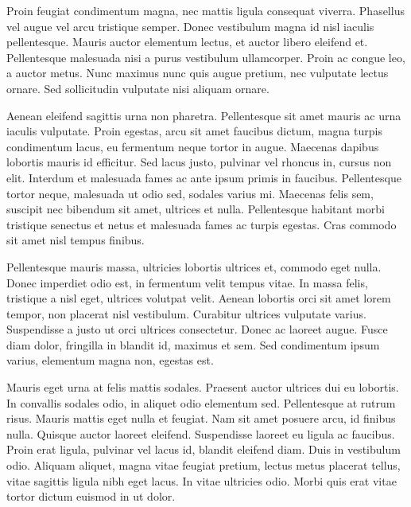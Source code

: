 \documentclass[11pt]{article}
\begin{document}
    Proin feugiat condimentum magna, nec mattis ligula consequat viverra. Phasellus vel augue vel arcu tristique semper. Donec vestibulum magna id nisl iaculis pellentesque. Mauris auctor elementum lectus, et auctor libero eleifend et. Pellentesque malesuada nisi a purus vestibulum ullamcorper. Proin ac congue leo, a auctor metus. Nunc maximus nunc quis augue pretium, nec vulputate lectus ornare. Sed sollicitudin vulputate nisi aliquam ornare.

    Aenean eleifend sagittis urna non pharetra. Pellentesque sit amet mauris ac urna iaculis vulputate. Proin egestas, arcu sit amet faucibus dictum, magna turpis condimentum lacus, eu fermentum neque tortor in augue. Maecenas dapibus lobortis mauris id efficitur. Sed lacus justo, pulvinar vel rhoncus in, cursus non elit. Interdum et malesuada fames ac ante ipsum primis in faucibus. Pellentesque tortor neque, malesuada ut odio sed, sodales varius mi. Maecenas felis sem, suscipit nec bibendum sit amet, ultrices et nulla. Pellentesque habitant morbi tristique senectus et netus et malesuada fames ac turpis egestas. Cras commodo sit amet nisl tempus finibus.

    Pellentesque mauris massa, ultricies lobortis ultrices et, commodo eget nulla. Donec imperdiet odio est, in fermentum velit tempus vitae. In massa felis, tristique a nisl eget, ultrices volutpat velit. Aenean lobortis orci sit amet lorem tempor, non placerat nisl vestibulum. Curabitur ultrices vulputate varius. Suspendisse a justo ut orci ultrices consectetur. Donec ac laoreet augue. Fusce diam dolor, fringilla in blandit id, maximus et sem. Sed condimentum ipsum varius, elementum magna non, egestas est.

    Mauris eget urna at felis mattis sodales. Praesent auctor ultrices dui eu lobortis. In convallis sodales odio, in aliquet odio elementum sed. Pellentesque at rutrum risus. Mauris mattis eget nulla et feugiat. Nam sit amet posuere arcu, id finibus nulla. Quisque auctor laoreet eleifend. Suspendisse laoreet eu ligula ac faucibus. Proin erat ligula, pulvinar vel lacus id, blandit eleifend diam. Duis in vestibulum odio. Aliquam aliquet, magna vitae feugiat pretium, lectus metus placerat tellus, vitae sagittis ligula nibh eget lacus. In vitae ultricies odio. Morbi quis erat vitae tortor dictum euismod in ut dolor.
\end{document}
